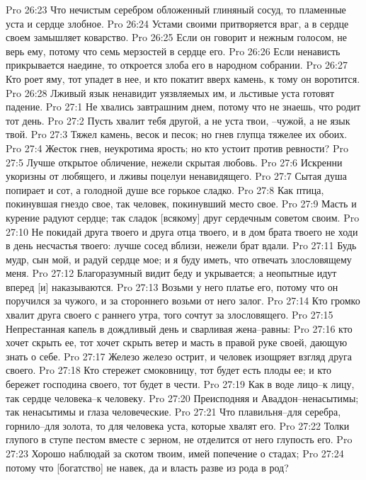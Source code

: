 Pro 26:23  Что нечистым серебром обложенный глиняный сосуд, то пламенные уста и сердце злобное.
Pro 26:24  Устами своими притворяется враг, а в сердце своем замышляет коварство.
Pro 26:25  Если он говорит и нежным голосом, не верь ему, потому что семь мерзостей в сердце его.
Pro 26:26  Если ненависть прикрывается наедине, то откроется злоба его в народном собрании.
Pro 26:27  Кто роет яму, тот упадет в нее, и кто покатит вверх камень, к тому он воротится.
Pro 26:28  Лживый язык ненавидит уязвляемых им, и льстивые уста готовят падение.
Pro 27:1  Не хвались завтрашним днем, потому что не знаешь, что родит тот день.
Pro 27:2  Пусть хвалит тебя другой, а не уста твои, --чужой, а не язык твой.
Pro 27:3  Тяжел камень, весок и песок; но гнев глупца тяжелее их обоих.
Pro 27:4  Жесток гнев, неукротима ярость; но кто устоит против ревности?
Pro 27:5  Лучше открытое обличение, нежели скрытая любовь.
Pro 27:6  Искренни укоризны от любящего, и лживы поцелуи ненавидящего.
Pro 27:7  Сытая душа попирает и сот, а голодной душе все горькое сладко.
Pro 27:8  Как птица, покинувшая гнездо свое, так человек, покинувший место свое.
Pro 27:9  Масть и курение радуют сердце; так сладок [всякому] друг сердечным советом своим.
Pro 27:10  Не покидай друга твоего и друга отца твоего, и в дом брата твоего не ходи в день несчастья твоего: лучше сосед вблизи, нежели брат вдали.
Pro 27:11  Будь мудр, сын мой, и радуй сердце мое; и я буду иметь, что отвечать злословящему меня.
Pro 27:12  Благоразумный видит беду и укрывается; а неопытные идут вперед [и] наказываются.
Pro 27:13  Возьми у него платье его, потому что он поручился за чужого, и за стороннего возьми от него залог.
Pro 27:14  Кто громко хвалит друга своего с раннего утра, того сочтут за злословящего.
Pro 27:15  Непрестанная капель в дождливый день и сварливая жена--равны:
Pro 27:16  кто хочет скрыть ее, тот хочет скрыть ветер и масть в правой руке своей, дающую знать о себе.
Pro 27:17  Железо железо острит, и человек изощряет взгляд друга своего.
Pro 27:18  Кто стережет смоковницу, тот будет есть плоды ее; и кто бережет господина своего, тот будет в чести.
Pro 27:19  Как в воде лицо--к лицу, так сердце человека--к человеку.
Pro 27:20  Преисподняя и Аваддон--ненасытимы; так ненасытимы и глаза человеческие.
Pro 27:21  Что плавильня--для серебра, горнило--для золота, то для человека уста, которые хвалят его.
Pro 27:22  Толки глупого в ступе пестом вместе с зерном, не отделится от него глупость его.
Pro 27:23  Хорошо наблюдай за скотом твоим, имей попечение о стадах;
Pro 27:24  потому что [богатство] не навек, да и власть разве из рода в род?
